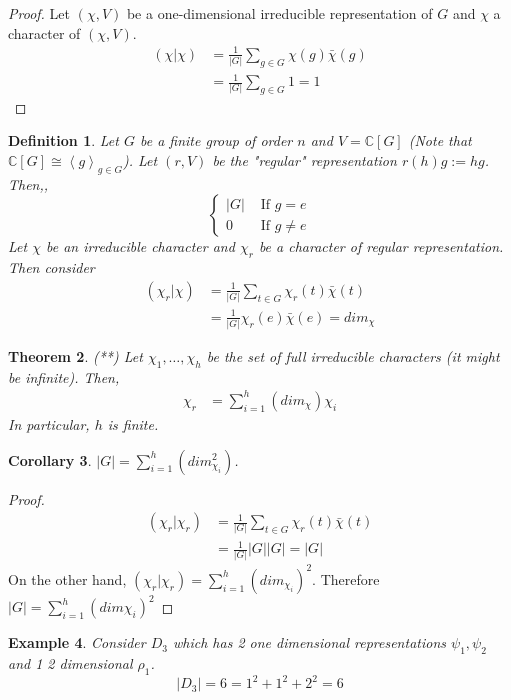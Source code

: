 \documentclass[letterpaper, leqno, 12pt]{article}
\newcommand{\fin}{\qquad \quad \hfill \framebox[1.75mm][l]{\,}}
\providecommand{\abs}[1]{\left\lvert#1\right\rvert}
\providecommand{\ip}[1]{\left\langle #1 \right\rangle}
\newcommand{\bC} {\mathbb{C}}
\theoremstyle{stdthm}
\newtheorem{thm}{Theorem}
\newtheorem{cor}[thm]{Corollary}
\theoremstyle{stddef}
\newtheorem{defn}[thm]{Definition}
\newtheorem{eg}[thm]{Example} %
\theoremstyle{stdnonum}
\theoremstyle{stdqands}
\theoremstyle{stdbold}
\begin{document}
\begin{proof}
Let $(\chi,V)$ be a one-dimensional irreducible representation of $G$ and $\chi$ a character of $(\chi,V)$. 
\begin{align*}
(\chi|\chi) &= \frac{1}{\abs{G}} \sum_{g \in G} \chi(g) \bar{\chi}(g)\\
&=\frac{1}{\abs{G}} \sum_{g\in G} 1 = 1
\end{align*}

\end{proof}
\begin{defn}
Let $G$ be a finite group of order $n$ and $V = \bC[G]$ (Note that $\bC[G] \cong \ip{g}_{g\in G}$).  Let $(r,V)$ be the "regular" representation $r(h) g:= hg$. Then,,
\[
\begin{cases}
\abs{G} &\text{ If } g=e\\
0 & \text{ If } g \neq e
\end{cases}
\]
Let $\chi$ be an irreducible character and $\chi_r$ be a character of regular representation. Then consider
\begin{align*}
(\chi_r| \chi) &= \frac{1}{\abs{G}} \sum_{t\in G} \chi_r(t) \bar{\chi}(t)\\
&= \frac{1}{\abs{G}} \chi_r(e) \bar{\chi}(e)  = dim_\chi
\end{align*}
\end{defn}

\begin{thm}
(**) Let $\chi_1,\dots ,\chi_h$ be the set of full irreducible characters (it might be infinite). Then,
\begin{align*}
\chi_r &= \sum_{i=1}^h \left(dim_\chi\right) \chi_i
\end{align*}
In particular, $h$ is finite. 
\end{thm}

\begin{cor}
$\abs{G} = \sum_{i=1}^h \left( dim_{\chi_i}^2 \right)$. 
\end{cor}

\begin{proof}
\begin{align*}
(\chi_r|\chi_r) &= \frac{1}{\abs{G}} \sum_{t\in G} \chi_r(t)\bar{\chi}(t)\\
&= \frac{1}{\abs{G}} \abs{G}\abs{G} = \abs{G}
\end{align*}
On the other hand, $(\chi_r|\chi_r) = \sum_{i=1}^h (dim_{\chi_i})^2$.  Therefore $\abs{G} = \sum_{i=1}^h (dim \chi_i)^2$
\end{proof}

\begin{eg}
Consider $D_3$ which has 2 one dimensional representations $\psi_1,\psi_2$ and 1 2 dimensional $\rho_1$. 
\[ |D_3| = 6 = 1^2 + 1^2 + 2^2 = 6 \]
\end{eg}
\end{document}
